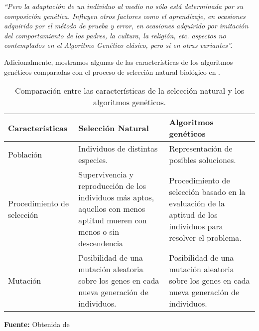 \documentclass[10pt,twocolumn,a4paper]{articuloAPA}
\begin{document}
\begin{displayquote}
  \textit{
    ``Pero la adaptación de un individuo al medio no sólo está determinada por su composición genética. Influyen otros factores como el aprendizaje, en ocasiones adquirido por el método de prueba y error, en ocasiones adquirido por imitación del comportamiento de los padres, la cultura, la religión, etc. aspectos no contemplados en el Algoritmo Genético clásico, pero sí en otras variantes''.
  }
\end{displayquote}

Adicionalmente, mostramos algunas de las características de los algoritmos genéticos comparadas con el proceso de selección natural biológico en .

\begin{table}
	\scriptsize
	\centering
	\begin{threeparttable}
		\caption{Comparación entre las características de la selección natural y los algoritmos genéticos.\vspace*{-5pt}}
		\label{tab:selecvsga}
		\begin{tabular}{p{0.2\tablelength}|p{0.4\tablelength}p{0.4\tablelength}}
			\hline
          Características
        & Selección Natural
        & Algoritmos genéticos \\
			\hline
          Población
        & Individuos de distintas especies.
        & Representación de posibles soluciones. \\

          Procedimiento de selección 
        & Supervivencia y reproducción de los individuos más aptos, aquellos con menos aptitud mueren con menos o sin descendencia 
        & Procedimiento de selección basado en la evaluación de la aptitud de los individuos para resolver el problema. \\

           Mutación 
        & Posibilidad de una mutación aleatoria sobre los genes en cada nueva generación de individuos. 
        & Posibilidad de una mutación aleatoria sobre los genes en cada nueva generación de individuos. \\
			\hline
		\end{tabular}
		\begin{tablenotes}
			\item {\scriptsize \textbf{Fuente:} Obtenida de \textcite{alfaro2021}}
		\end{tablenotes}
		\end{threeparttable}
	\end{table}	
\end{document}

